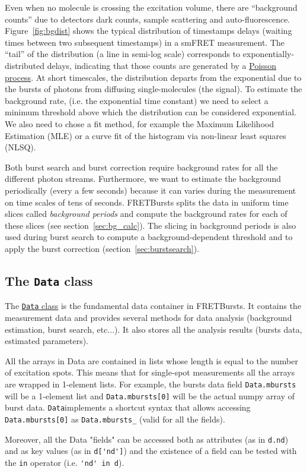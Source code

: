 Even when no molecule is crossing the excitation volume, there are “background counts” due to detectors dark counts, sample scattering and auto-fluorescence. Figure~\ref{fig:bgdist} shows the typical distribution of timestamps delays (waiting times between two subsequent timestamps) in a smFRET measurement. The “tail” of the distribution (a line in semi-log scale) corresponds to exponentially-distributed delays, indicating that those counts are generated by a \href{http://en.wikipedia.org/wiki/Poisson_process}{Poisson process}. At short timescales, the distribution departs from the exponential due to the bursts of photons from diffusing single-molecules (the signal). To estimate the background rate, (i.e. the exponential time constant) we need to select a minimum threshold above which the distribution can be considered exponential. We also need to chose a fit method, for example the Maximum Likelihood Estimation (MLE) or a curve fit of the histogram via non-linear least squares (NLSQ).

Both burst search and burst correction require background rates for all the different photon streams. Furthermore, we want to estimate the background periodically (every a few seconds) because it can varies during the measurement on time scales of tens of seconds. FRETBursts splits the data in uniform time slices called \textit{background periods} and compute the background rates for each of these slices (see section~\ref{sec:bg_calc}). The slicing in background periods is also used during burst search to compute a background-dependent threshold and to apply the burst correction (section~\ref{sec:burstsearch}).

\subsection{The \texttt{Data} class}
\label{sec:data_intro}

The \href{http://fretbursts.readthedocs.org/en/latest/data_class.html}{\texttt{Data} class} is the fundamental data container in FRETBursts. It contains the measurement data and provides several methods for data analysis (background estimation, burst search, etc...). It also stores all the analysis results (bursts data, estimated parameters).

All the arrays in Data are contained in lists whose length is equal to the number of excitation spots. This means that for single-spot measurements all the arrays are wrapped in 1-element lists. For example, the bursts data field \verb|Data.mbursts| will be a 1-element list and \verb|Data.mbursts[0]| will be the actual numpy array of burst data. \verb|Data|implements a shortcut syntax that allows accessing 
\verb|Data.mbursts[0]| as \verb|Data.mbursts_| (valid for all the fields).

Moreover, all the Data "fields" can be accessed both as attributes (as in \verb|d.nd|) and as key values (as in \verb|d['nd']|) and the existence of a field can be tested with the \verb|in| operator (i.e. \verb|'nd' in d|).
